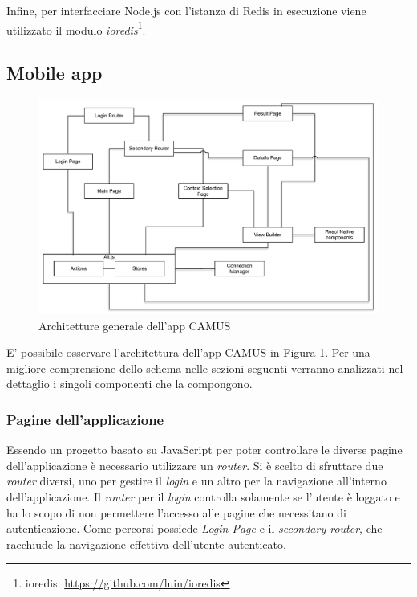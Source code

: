 Infine, per interfacciare Node.js con l'istanza di Redis in esecuzione viene utilizzato il modulo \emph{ioredis}\footnote{ioredis: \url{https://github.com/luin/ioredis}}.

\subsection {Mobile app}\label{sec:architettura-applicazione}

\begin{figure}[h]
	\centering
	\includegraphics[width=\textwidth]{4-progettazione-alto-livello/Immagini/app_architecture.pdf}
	\caption{Architetture generale dell'app CAMUS}\label{fig:app-architecture}
\end{figure}

E’ possibile osservare l’architettura dell’app CAMUS in Figura \ref{fig:app-architecture}. Per una migliore comprensione dello schema nelle sezioni seguenti verranno analizzati nel dettaglio i singoli componenti che la compongono.

\subsubsection{Pagine dell'applicazione}

Essendo un progetto basato su JavaScript per poter controllare le diverse pagine dell'applicazione è necessario utilizzare un \emph{router}. Si è scelto di sfruttare due \emph{router} diversi, uno per gestire il \emph{login} e un altro per la navigazione all'interno dell'applicazione. Il \emph{router} per il \emph{login} controlla solamente se l'utente è loggato e ha lo scopo di non permettere l'accesso alle pagine che necessitano di autenticazione. Come percorsi possiede \emph{Login Page} e il \emph{secondary router}, che racchiude la navigazione effettiva dell'utente autenticato.

